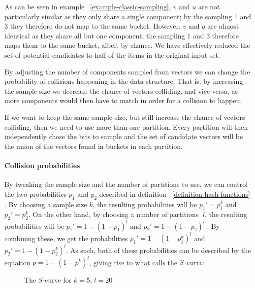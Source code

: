 As can be seen in example ~\ref{example-classic-sampling}, $v$ and $u$ are not particularly similar as they only share a single component; by the sampling 1 and 3 they therefore do not map to the same bucket. However, $v$ and $q$ are almost identical as they share all but one component; the sampling 1 and 3 therefore maps them to the same bucket, albeit by chance. We have effectively reduced the set of potential candidates to half of the items in the original input set.

By adjusting the number of components sampled from vectors we can change the probability of collisions happening in the data structure. That is, by increasing the sample size we decrease the chance of vectors colliding, and vice versa, as more components would then have to match in order for a collision to happen.

If we want to keep the same sample size, but still increase the chance of vectors colliding, then we need to use more than one partition. Every partition will then independently chose the bits to sample and the set of candidate vectors will be the union of the vectors found in buckets in each partition.

\paragraph{Collision probabilities} By tweaking the sample size and the number of partitions to use, we can control the two probabilities $p_1$ and $p_2$ described in definition ~\ref{definition-hash-functions} \cite[p. 101]{DBLP:books/cu/LeskovecRU14}. By choosing a sample size $k$, the resulting probabilities will be $p_1' = p_1^k$ and  $p_2' = p_2^k$. On the other hand, by choosing a number of partitions 􏰄$l$, the resulting probabilities will be $p_1' = 1 - (1 - p_1)^l$ and $p_2' = 1 - (1 - p_2)^l􏰅$. By combining these, we get the probabilities $p_1' = 1 - (1 - p_1^k)^l$ and $p_2' = 1 - (1 - p_2^k)^l$. As such, both of these probabilities can be described by the equation $p = 1 - (1 - p^k)^l$, giving rise to what \cite[p. 89]{DBLP:books/cu/LeskovecRU14} calls the \textit{$S$-curve}:

\begin{figure}[ht]

  \caption{The $S$-curve for $k = 5$, $l = 20$}
\end{figure}

